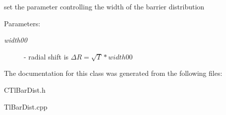 set the parameter controlling the width of the barrier distribution \begin{Desc}
\item[Parameters:]
\begin{description}
\item[{\em width00}]- radial shift is $ \Delta R= \sqrt T* width00 $ \end{description}
\end{Desc}


The documentation for this class was generated from the following files:\begin{CompactItemize}
\item 
CTl\-Bar\-Dist.h\item 
Tl\-Bar\-Dist.cpp\end{CompactItemize}
